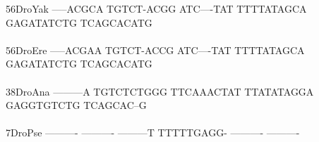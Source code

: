 \documentclass[11pt,twoside,reqno,a4paper]{article}
\begin{document}
{56\hspace*{3\charwidth}DroYak	-----ACGCA	TGTCT-ACGG	ATC----TAT	TTTTATAGCA	GAGATATCTG	TCAGCACATG	\\
\hspace*{5\charwidth}\hspace*{7\charwidth}\hspace*{1\charwidth}\hspace*{1\charwidth}\hspace*{1\charwidth}\hspace*{1\charwidth}\hspace*{1\charwidth}\hspace*{1\charwidth}\\
56\hspace*{3\charwidth}DroEre	-----ACGAA	TGTCT-ACCG	ATC----TAT	TTTTATAGCA	GAGATATCTG	TCAGCACATG	\\
\hspace*{5\charwidth}\hspace*{7\charwidth}\hspace*{1\charwidth}\hspace*{1\charwidth}\hspace*{1\charwidth}\hspace*{1\charwidth}\hspace*{1\charwidth}\hspace*{1\charwidth}\\
38\hspace*{3\charwidth}DroAna	---------A	TGTCTCTGGG	TTCAAACTAT	TTATATAGGA	GAGGTGTCTG	TCAGCAC--G	\\
\hspace*{5\charwidth}\hspace*{7\charwidth}\hspace*{1\charwidth}\hspace*{1\charwidth}\hspace*{1\charwidth}\hspace*{1\charwidth}\hspace*{1\charwidth}\hspace*{1\charwidth}\\
7\hspace*{4\charwidth}DroPse	----------	----------	---------T	TTTTTGAGG-	----------	----------	\\
\hspace*{5\charwidth}\hspace*{7\charwidth}\hspace*{1\charwidth}\hspace*{1\charwidth}\hspace*{1\charwidth}\hspace*{1\charwidth}\hspace*{1\charwidth}\hspace*{1\charwidth}\\
}
\end{document}
